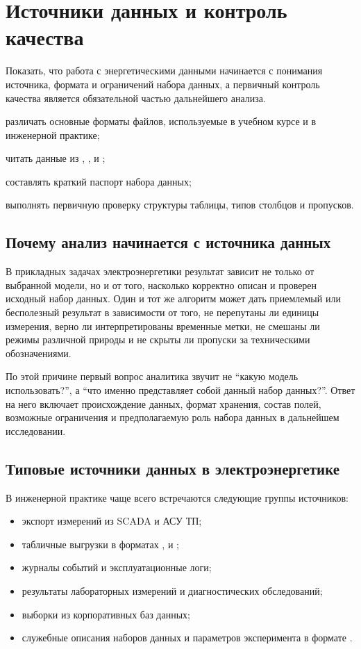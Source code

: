 \chapter{Источники данных и контроль качества}

\chaptergoals
  {Показать, что работа с энергетическими данными начинается с понимания источника, формата и ограничений набора данных, а первичный контроль качества является обязательной частью дальнейшего анализа.}
  {
    \item различать основные форматы файлов, используемые в учебном курсе и в инженерной практике;
    \item читать данные из , ,  и ;
    \item составлять краткий паспорт набора данных;
    \item выполнять первичную проверку структуры таблицы, типов столбцов и пропусков.
  }

\section{Почему анализ начинается с источника данных}

В прикладных задачах электроэнергетики результат зависит не только от выбранной модели, но и от того, насколько корректно описан и проверен исходный набор данных. Один и тот же алгоритм может дать приемлемый или бесполезный результат в зависимости от того, не перепутаны ли единицы измерения, верно ли интерпретированы временные метки, не смешаны ли режимы различной природы и не скрыты ли пропуски за техническими обозначениями.

По этой причине первый вопрос аналитика звучит не ``какую модель использовать?'', а ``что именно представляет собой данный набор данных?''. Ответ на него включает происхождение данных, формат хранения, состав полей, возможные ограничения и предполагаемую роль набора данных в дальнейшем исследовании.

\section{Типовые источники данных в электроэнергетике}

В инженерной практике чаще всего встречаются следующие группы источников:
\begin{itemize}[leftmargin=1.25cm]
\item экспорт измерений из SCADA и АСУ ТП;
\item табличные выгрузки в форматах ,  и ;
\item журналы событий и эксплуатационные логи;
\item результаты лабораторных измерений и диагностических обследований;
\item выборки из корпоративных баз данных;
\item служебные описания наборов данных и параметров эксперимента в формате .
\end{itemize}


